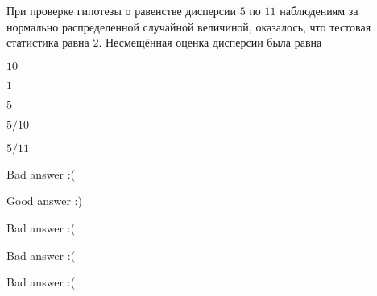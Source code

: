 
\begin{question}
При проверке гипотезы о равенстве дисперсии \(5\) по \(11\) наблюдениям
за нормально распределенной случайной величиной, оказалось, что тестовая
статистика равна \(2\). Несмещённая оценка дисперсии была равна
\begin{answerlist}
  \item \(10\)
  \item \(1\)
  \item \(5\)
  \item \(5/10\)
  \item \(5/11\)
\end{answerlist}
\end{question}

\begin{solution}
\begin{answerlist}
  \item Bad answer :(
  \item Good answer :)
  \item Bad answer :(
  \item Bad answer :(
  \item Bad answer :(
\end{answerlist}
\end{solution}

